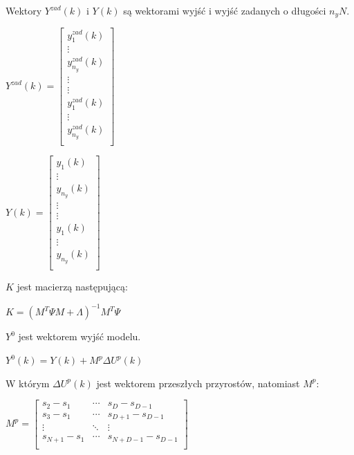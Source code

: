 Wektory $Y^{zad}(k)$ i $Y(k)$ są wektorami wyjść i wyjść zadanych o długości $n_yN$.

\begin{math}
    Y^{zad}(k) = \begin{bmatrix}
        y^{zad}_1(k) \\
        \vdots \\
        y^{zad}_{n_y}(k) \\
        \vdots \\
        \vdots \\
        y^{zad}_1(k) \\
        \vdots \\
        y^{zad}_{n_y}(k) \\
    \end{bmatrix}
\end{math}

\begin{math}
    Y(k) = \begin{bmatrix}
        y_1(k) \\
        \vdots \\
        y_{n_y}(k) \\
        \vdots \\
        \vdots \\
        y_1(k) \\
        \vdots \\
        y_{n_y}(k) \\
    \end{bmatrix}
\end{math}

$K$ jest macierzą następującą:

\begin{math}
    K = (M^T \varPsi M + \varLambda )^{-1} M^T \varPsi 
\end{math}

$Y^0$ jest wektorem wyjść modelu.

\begin{math}
    Y^0(k) = Y(k) + M^p \Delta U^p(k)
\end{math}

W którym $\Delta U^p(k)$ jest wektorem przeszłych przyrostów, natomiast $M^p$:

\begin{math}
    M^p = \begin{bmatrix}
        s_2 - s_1 & \cdots & s_D - s_{D - 1} \\
        s_3 - s_1 & \cdots & s_{D + 1} - s_{D - 1} \\
        \vdots & \ddots &\vdots \\
        s_{N + 1} - s_1 & \cdots & s_{N + D - 1} - s_{D - 1} \\
    \end{bmatrix}
\end{math}

